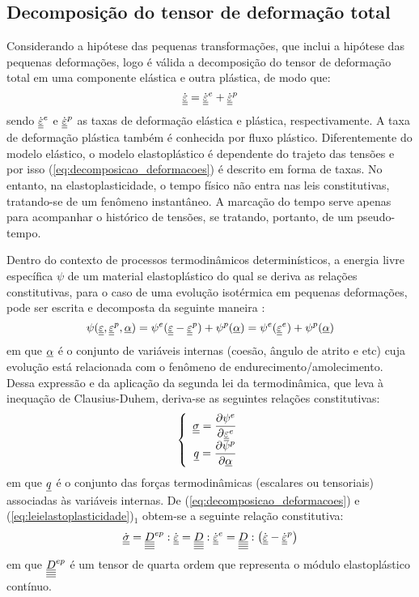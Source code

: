 \subsection{Decomposição do tensor de deformação total}
Considerando a hipótese das pequenas transformações, que inclui a hipótese das pequenas deformações, logo é válida a decomposição do tensor de deformação total em uma componente elástica e outra plástica, de modo que:
\begin{equation}
	\label{eq:decomposicao_deformacoes}
	\dot {\underline{\underline \varepsilon}} = \dot {\underline{\underline \varepsilon}}^e + \dot {\underline{\underline \varepsilon}}^p 
\end{equation}
sendo $\dot {\underline{\underline \varepsilon}}^e$ e $\dot {\underline{\underline \varepsilon}}^p$ as taxas de deformação elástica e plástica, respectivamente. A taxa de deformação plástica também é conhecida por fluxo plástico. Diferentemente do modelo elástico, o modelo elastoplástico é dependente do trajeto das tensões e por isso (\ref{eq:decomposicao_deformacoes}) é descrito em forma de taxas. No entanto, na elastoplasticidade, o tempo físico não entra nas leis constitutivas, tratando-se de um fenômeno instantâneo. A marcação do tempo serve apenas para acompanhar o histórico de tensões, se tratando, portanto, de um pseudo-tempo.

Dentro do contexto de processos termodinâmicos determinísticos, a energia livre específica $\psi$ de um material elastoplástico do qual se deriva as relações constitutivas, para o caso de uma evolução isotérmica em pequenas deformações, pode ser escrita e decomposta da seguinte maneira \cite[p. 149]{Neto2008}:
\begin{equation}
	\label{eq:energia_livre}
	\psi(\underline{\underline \varepsilon},\underline{\underline \varepsilon}^p,\underline \alpha) = \psi^e(\underline{\underline \varepsilon}-\underline{\underline \varepsilon}^p)+ \psi^p(\underline \alpha) = \psi^e(\underline{\underline \varepsilon}^e)+ \psi^p(\underline \alpha) 
\end{equation}
em que $\underline \alpha$ é o conjunto de variáveis internas (coesão, ângulo de atrito e etc) cuja evolução está relacionada com o fenômeno de endurecimento/amolecimento. Dessa expressão e da aplicação da segunda lei da termodinâmica, que leva à inequação de Clausius-Duhem, deriva-se as seguintes relações constitutivas:
\begin{equation}
	\label{eq:leielastoplasticidade}
		\left\{
		\begin{array}{rcl}
			\underline{\underline \sigma} = \dfrac{\partial \psi^e}{\partial \underline{\underline \varepsilon}^e} \\ 
			\underline q = \dfrac{\partial \psi^p}{\partial \underline \alpha}
			
		\end{array}
		\right.
\end{equation}
em que $\underline q$ é o conjunto das forças termodinâmicas (escalares ou tensoriais) associadas às variáveis internas. De (\ref{eq:decomposicao_deformacoes}) e (\ref{eq:leielastoplasticidade})$_1$ obtem-se a seguinte relação constitutiva:
\begin{equation}
	\label{eq:leielastoplastica}
	\dot {\underline{\underline \sigma}} = \underline{\underline{\underline{\underline D}}}^{ep}:\dot {\underline{\underline \varepsilon}} = \underline{\underline{\underline{\underline D}}}:\dot {\underline{\underline \varepsilon}}^e = \underline{\underline{\underline{\underline D}}}:\left(\dot {\underline{\underline \varepsilon}} - \dot {\underline{\underline \varepsilon}}^p \right)
\end{equation}
em que $\underline{\underline{\underline{\underline D}}}^{ep}$ é um tensor de quarta ordem que representa o módulo elastoplástico contínuo.

